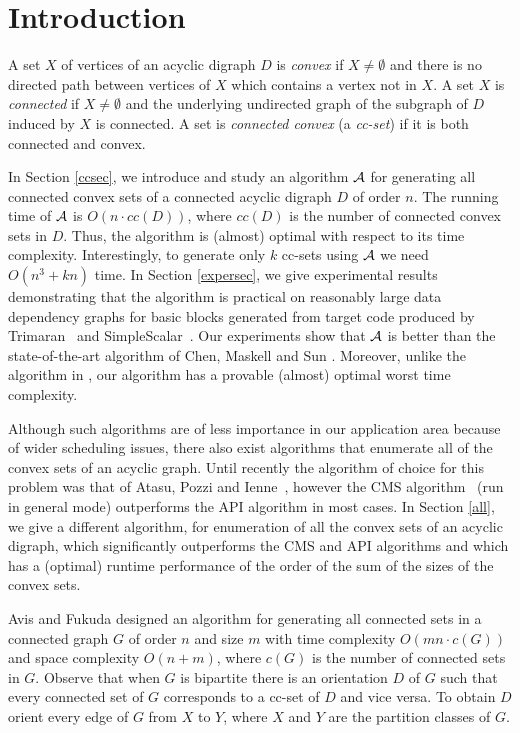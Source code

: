 \documentclass[11pt]{article}
\newcommand{\2}{\vspace{0.2 cm}}
\begin{document}
\section{Introduction}

A set $X$ of vertices of an acyclic digraph $D$ is {\em convex} if
$X\neq \emptyset$ and there is no directed path between vertices of
$X$ which contains a vertex not in $X$. A set $X$ is {\em connected}
if $X\neq \emptyset$ and the underlying undirected graph of the
subgraph of $D$ induced by $X$ is connected. A set is {\em connected
convex} (a {\em cc-set}) if it is both connected and convex.


In Section \ref{ccsec}, we introduce and study an algorithm $\cal A$
for generating all connected convex sets of a connected acyclic
digraph $D$ of order $n$. The running time of $\cal A$ is $O(n\cdot
cc(D))$, where $cc(D)$ is the number of connected convex sets in
$D$. Thus, the algorithm is (almost) optimal with respect to its
time complexity. Interestingly, to generate only $k$ cc-sets using
$\cal A$ we need $O(n^3+kn)$ time. In Section \ref{expersec}, we
give experimental results demonstrating that the algorithm is
practical on reasonably large data dependency graphs for basic
blocks generated from target code produced by
Trimaran~\cite{trimaran} and SimpleScalar~\cite{simplescalar}. Our
experiments show that $\cal A$ is better than the state-of-the-art
algorithm of Chen, Maskell and Sun \cite{chen}. Moreover, unlike the
algorithm in \cite{chen}, our algorithm has a provable (almost)
optimal worst time complexity.

Although such algorithms are of less importance in our application
area because of wider scheduling issues, there also exist algorithms
that enumerate all of the convex sets of an acyclic graph. Until
recently the algorithm of choice for this problem was that of Atasu,
Pozzi and Ienne~\cite{atasu2003, atasu2006}, however the CMS
algorithm~\cite{chen} (run in general mode) outperforms the API
algorithm in most cases. In Section \ref{all}, we give a different
algorithm, for enumeration of all the convex sets of an acyclic
digraph, which significantly outperforms the CMS and API
algorithms and which has a (optimal) runtime performance of the
order of the sum of the sizes of the convex sets.

Avis and Fukuda \cite{avisDAM65} designed an algorithm for
generating all connected sets in a connected graph $G$ of order $n$
and size $m$ with time complexity $O(mn\cdot c(G))$ and space
complexity $O(n+m)$, where $c(G)$ is the number of connected sets in
$G$. Observe that when $G$ is bipartite there is an orientation $D$
of $G$ such that every connected set of $G$ corresponds to a cc-set
of $D$ and vice versa. To obtain $D$ orient every edge of $G$ from
$X$ to $Y$, where $X$ and $Y$ are the partition classes of $G$.
\end{document}

